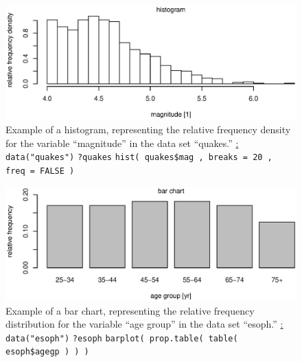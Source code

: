 %
\begin{figure}[!htb]
\begin{center}
\includegraphics[scale=0.8]{histogram.eps}
\end{center}
\caption{Example of a histogram, representing the relative
frequency density for the variable ``magnitude'' in the
\R{} data set ``quakes.''
\newline
\underline{\R:} \newline
\texttt{data("quakes")} \newline
\texttt{?quakes} \newline
\texttt{hist( quakes\$mag , breaks = 20 , freq = FALSE )}}
\end{figure}
%

%
\begin{figure}[!htb]
\begin{center}
\includegraphics[scale=0.8]{barchart.eps}
\end{center}
\caption{Example of a bar chart, representing the relative
frequency distribution for the variable ``age group'' in the
\R{} data set ``esoph.'' \newline
\underline{\R:} \newline
\texttt{data("esoph")} \newline
\texttt{?esoph} \newline
\texttt{barplot( prop.table( table( esoph\$agegp ) ) )}}
\end{figure}
%

